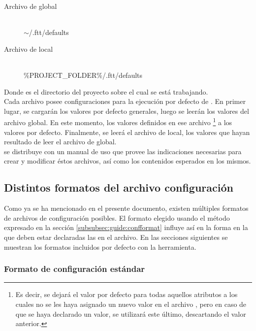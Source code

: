 \begin{description}
	\item[Archivo de  global] \hfill \\
	$\sim$/.ftt/defaults
	\item[Archivo de  local] \hfill \\
	\%PROJECT\_FOLDER\%/.ftt/defaults
\end{description}

Donde  es el directorio del proyecto sobre el cual 
se está trabajando.\\
Cada archivo posee configuraciones para la ejecución por defecto de 
\fronttier. En primer lugar, se cargarán los valores por defecto
generales, luego se leerán los valores del archivo  global. En este 
momento, los valores definidos en ese archivo \footnote{
	Es decir, se dejará el valor por defecto para todas aquellos atributos a 
	los cuales no se les haya asignado un nuevo valor en el archivo , 
	pero en caso de que se haya declarado un valor, se utilizará este último, 
	descartando el valor anterior.
} a los valores por defecto. Finalmente, se leerá el archivo de  
local,  los valores que hayan resultado de leer el archivo de  global.\\
\fronttier se distribuye con un manual de uso que provee las indicaciones 
necesarias para crear y modificar éstos archivos, así como los contenidos 
esperados en los mismos.


\subsection{Distintos formatos del archivo configuración}
\label{subsec:formats}

Como ya se ha mencionado en el presente documento, existen múltiples formatos 
de archivos de configuración posibles. El formato elegido usando el método 
expresado en la sección \ref{subsubsec:guide:confformat} influye así en la 
forma en la que deben estar declaradas las \dependencies en el archivo. En las 
secciones siguientes se muestran los formatos incluidos por defecto con la 
herramienta.

\subsubsection{Formato de configuración estándar}
\label{subsubsec:formats:standar}


